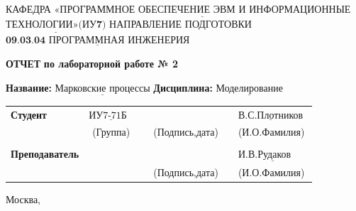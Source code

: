 \documentclass[12pt,a4paper,oneside]{report}
\begin{document}
\noindent КАФЕДРА $\underline{\textbf{«ПРОГРАММНОЕ ОБЕСПЕЧЕНИЕ ЭВМ И ИНФОРМАЦИОННЫЕ}}$\newline\newline $\underline{\textbf{ТЕХНОЛОГИИ»(ИУ7)}}$\newline\newline
\noindent НАПРАВЛЕНИЕ ПОДГОТОВКИ $\underline{\textbf{09.03.04 ПРОГРАММНАЯ ИНЖЕНЕРИЯ}}$\newline\newline\newline\newline\newline\newline\newline
\begin{center}
    \begin{flushright}
    \Large\textbf{ОТЧЕТ}\newline
	\Large\textbf{по лабораторной работе № 2}\newline
	\end{flushright}
\end{center}
\noindent\textbf{Название:} $\underline{\text{Марковские процессы}}$\newline\newline
\noindent\textbf{Дисциплина:} $\underline{\text{Моделирование}}$\newline\newline\newline\newline\newline\newline\newline\newline
\begin{tabular}{lcp{5em}lp{2em}l}
	\noindent\textbf{Студент} &  $\underline{\text{ИУ7-71Б~~}}$ &             &\hspace{1cm} & & $\underline{\text{В.С.Плотников}}$ \\\cline{4-3}
	 & (Группа) & &(Подпись,дата)  & & (И.О.Фамилия) \\
	 & & & & &\\
	\noindent\textbf{Преподаватель} &  & &\hspace{1cm} & &$\underline{\text{И.В.Рудаков ~~~~}}$ \\\cline{4-3} 
	 &  & & (Подпись,дата)  & &(И.О.Фамилия) \\
    \end{tabular}
\begin{center}
	\vfill
	Москва, \the\year
\end{center}
\clearpage
\end{document}
